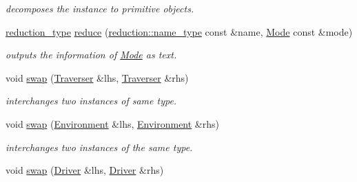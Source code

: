 \begin{DoxyCompactItemize}
\begin{DoxyCompactList}\small\item\em decomposes the instance to primitive objects. \end{DoxyCompactList}\item 
\hypertarget{namespacehryky_1_1display_a2de35998fde721b8f791d6fae6548d34}{\hyperlink{namespacehryky_a343a9a4c36a586be5c2693156200eadc}{reduction\-\_\-type} \hyperlink{namespacehryky_1_1display_a2de35998fde721b8f791d6fae6548d34}{reduce} (\hyperlink{namespacehryky_1_1reduction_ac686c30a4c8d196bbd0f05629a6b921f}{reduction\-::name\-\_\-type} const \&name, \hyperlink{classhryky_1_1display_1_1_mode}{Mode} const \&mode)}\label{namespacehryky_1_1display_a2de35998fde721b8f791d6fae6548d34}

\begin{DoxyCompactList}\small\item\em outputs the information of \hyperlink{classhryky_1_1display_1_1_mode}{Mode} as text. \end{DoxyCompactList}\item 
void \hyperlink{namespacehryky_1_1display_a85ddc8d76c030d7471688957b65e9ad1}{swap} (\hyperlink{classhryky_1_1display_1_1_traverser}{Traverser} \&lhs, \hyperlink{classhryky_1_1display_1_1_traverser}{Traverser} \&rhs)
\begin{DoxyCompactList}\small\item\em interchanges two instances of same type. \end{DoxyCompactList}\item 
\hypertarget{namespacehryky_1_1display_af5a4b994dfceda155b2bbc928fe00559}{void \hyperlink{namespacehryky_1_1display_af5a4b994dfceda155b2bbc928fe00559}{swap} (\hyperlink{classhryky_1_1display_1_1_environment}{Environment} \&lhs, \hyperlink{classhryky_1_1display_1_1_environment}{Environment} \&rhs)}\label{namespacehryky_1_1display_af5a4b994dfceda155b2bbc928fe00559}

\begin{DoxyCompactList}\small\item\em interchanges two instances of the same type. \end{DoxyCompactList}\item 
\hypertarget{namespacehryky_1_1display_ad28f0d5e406742090973e6c81321a00f}{void \hyperlink{namespacehryky_1_1display_ad28f0d5e406742090973e6c81321a00f}{swap} (\hyperlink{classhryky_1_1display_1_1_driver}{Driver} \&lhs, \hyperlink{classhryky_1_1display_1_1_driver}{Driver} \&rhs)}\label{namespacehryky_1_1display_ad28f0d5e406742090973e6c81321a00f}


\end{DoxyCompactItemize}
